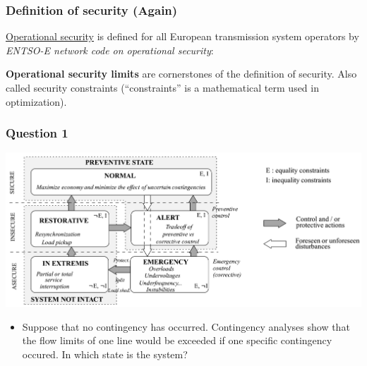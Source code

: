 \documentclass[compress]{beamer}
\begin{document}
\begin{frame}
  \frametitle{Definition of security (Again)}
\underline{Operational security} is defined for all European transmission system operators by \emph{ENTSO-E network code on operational security}:
\begin{block}{}
\end{block}
\begin{block}{}
\textbf{Operational security limits} are cornerstones of the definition of security. Also called security constraints (``constraints'' is a mathematical term used in optimization).
\end{block}
\end{frame}

\begin{frame}
  \frametitle{Question 1}
\includegraphics[width=\textwidth]{Figs/FinkCarlsen_SecurityDiagram.png}\\
\begin{itemize}
\item Suppose that no contingency has occurred. Contingency analyses show that the flow limits of one line would be exceeded if one specific contingency occured. In which state is the system?
\end{itemize}
\end{frame}
\end{document}
